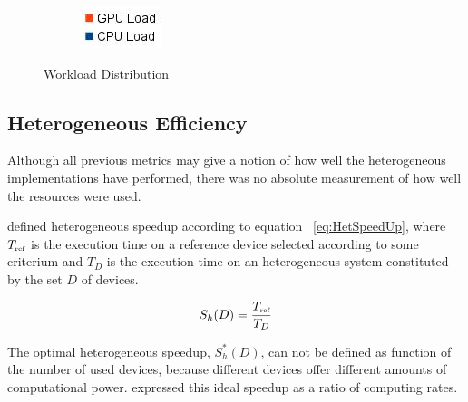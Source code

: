 \begin{figure}[H]
\begin{subfigure}[h]{0.15\textwidth}
\includegraphics[width=\textwidth]{img/wlLeg.jpg}
\end{subfigure}

\caption{\label{img:wl} Workload Distribution}

\end{figure}

\subsection{\label{subsec:hefficiency} Heterogeneous Efficiency}


Although all previous metrics may give a notion of how well the heterogeneous implementations have performed, there was no absolute measurement of how well the resources were used.

\cite{Chamberlain98} defined heterogeneous speedup according to equation ~\ref{eq:HetSpeedUp}, where $T_{\mbox{\tiny ref}}$ is the execution time on a reference device selected according to some criterium and $T_D$ is the execution time on an heterogeneous system constituted by the set $D$ of devices.

\begin{equation}
S_h(D) = \frac{T_{\mbox{\tiny ref}}}{T_D}
\label{eq:HetSpeedUp}
\end{equation}

The optimal heterogeneous speedup, $S_h^*(D)$, can not be defined as function of the number of used devices, because different devices offer different amounts of computational power. \cite{Chamberlain98} expressed this ideal speedup as a ratio of computing rates. 


